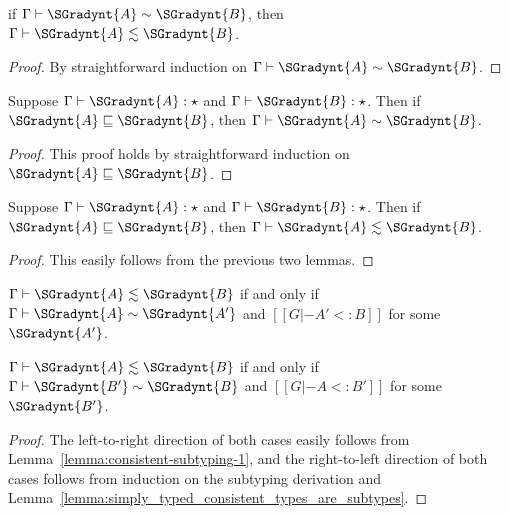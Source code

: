 \begin{lemma}
  \label{lemma:consistent-subtyping-3}
  if $ \Gamma  \vdash  \SGradynt{A}  \sim  \SGradynt{B} $, then $ \Gamma  \vdash  \SGradynt{A}  \lesssim  \SGradynt{B} $.
\end{lemma}
\begin{proof}
  By straightforward induction on $ \Gamma  \vdash  \SGradynt{A}  \sim  \SGradynt{B} $.
\end{proof}

\begin{lemma}
  \label{lemma:type_precision_and_consistency}
  Suppose $ \Gamma  \vdash  \SGradynt{A}  : \star $ and $ \Gamma  \vdash  \SGradynt{B}  : \star $.  Then
  if $ \SGradynt{A}  \sqsubseteq  \SGradynt{B} $, then $ \Gamma  \vdash  \SGradynt{A}  \sim  \SGradynt{B} $.
\end{lemma}
\begin{proof}
  This proof holds by straightforward induction on $ \SGradynt{A}  \sqsubseteq  \SGradynt{B} $.
\end{proof}

\begin{corollary}
  \label{corollary:type_precision_and_subtyping}
  Suppose $ \Gamma  \vdash  \SGradynt{A}  : \star $ and $ \Gamma  \vdash  \SGradynt{B}  : \star $.  Then
  if $ \SGradynt{A}  \sqsubseteq  \SGradynt{B} $, then $ \Gamma  \vdash  \SGradynt{A}  \lesssim  \SGradynt{B} $.
\end{corollary}
\begin{proof}
  This easily follows from the previous two lemmas.
\end{proof}

\begin{corollary}
  \label{corollary:consistent_subtyping}
  \begin{enumR}
  \item[]
  \item $ \Gamma  \vdash  \SGradynt{A}  \lesssim  \SGradynt{B} $ if and only if $ \Gamma  \vdash  \SGradynt{A}  \sim  \SGradynt{A'} $ and $[[G |- A' <: B]]$ for some $\SGradynt{A'}$.
  \item $ \Gamma  \vdash  \SGradynt{A}  \lesssim  \SGradynt{B} $ if and only if $ \Gamma  \vdash  \SGradynt{B'}  \sim  \SGradynt{B} $ and $[[G |- A <: B']]$ for some $\SGradynt{B'}$.
  \end{enumR}
\end{corollary}
\begin{proof}
  The left-to-right direction of both cases easily follows from
  Lemma~\ref{lemma:consistent-subtyping-1}, and the right-to-left
  direction of both cases follows from induction on the subtyping
  derivation and Lemma~\ref{lemma:simply_typed_consistent_types_are_subtypes}.
\end{proof}

